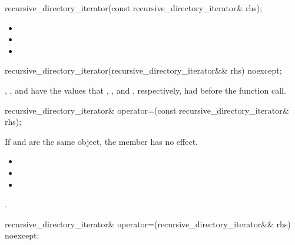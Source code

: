 %
\begin{itemdecl}
recursive_directory_iterator(const recursive_directory_iterator& rhs);
\end{itemdecl}

\begin{itemdescr}
\pnum
\ensures
\begin{itemize}
\item {}
\item {}
\item {}
\end{itemize}
\end{itemdescr}

%
\begin{itemdecl}
recursive_directory_iterator(recursive_directory_iterator&& rhs) noexcept;
\end{itemdecl}

\begin{itemdescr}
\pnum
\ensures
{}, ,
  and  have the values that
  , , and
  , respectively, had before the function call.
\end{itemdescr}

%
\begin{itemdecl}
recursive_directory_iterator& operator=(const recursive_directory_iterator& rhs);
\end{itemdecl}

\begin{itemdescr}
\pnum
\effects
If  and  are the same
  object, the member has no effect.

\pnum
\ensures
\begin{itemize}
\item {}
\item {}
\item {}
\end{itemize}

\pnum
\returns
{}.
\end{itemdescr}

%
\begin{itemdecl}
recursive_directory_iterator& operator=(recursive_directory_iterator&& rhs) noexcept;
\end{itemdecl}

